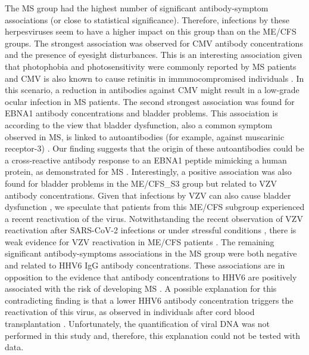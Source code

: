 The MS group had the highest number of significant antibody-symptom associations (or close to statistical significance). Therefore, infections by these herpesviruses seem to have a higher impact on this group than on the ME/CFS groups. The strongest association was observed for CMV antibody concentrations and the presence of eyesight disturbances. This is an interesting association given that photophobia and photosensitivity were commonly reported by MS patients \citep{cortese2018PhotophobiaMultiple} and CMV is also known to cause retinitis in immunocompromised individuals \citep{port2017CytomegalovirusRetinitis}. In this scenario, a reduction in antibodies against CMV might result in a low-grade ocular infection in MS patients. The second strongest association was found for EBNA1 antibody concentrations and bladder problems. This association is according to the view that bladder dysfunction, also a common symptom observed in MS, is linked to autoantibodies (for example, against muscarinic receptor-3) \citep{mccombe2009BladderDysfunction}. Our finding suggests that the origin of these autoantibodies could be a cross-reactive antibody response to an EBNA1 peptide mimicking a human protein, as demonstrated for MS \citep{ayoglu2016AnoctaminIdentified, tengvall2019MolecularMimicry, lanz2022ClonallyExpanded}. Interestingly, a positive association was also found for bladder problems in the ME/CFS\_S3 group but related to VZV antibody concentrations. Given that infections by VZV can also cause bladder dysfunction \citep{sakakibara2022VaricellazosterVirus}, we speculate that patients from this ME/CFS subgroup experienced a recent reactivation of the virus. Notwithstanding the recent observation of VZV reactivation after SARS-CoV-2 infections \citep{martinez-reviejo2022VaricellaZosterVirus} or under stressful conditions \citep{rooney2019HerpesVirus}, there is weak evidence for VZV reactivation in ME/CFS patients \citep{koelle2002MarkersViral, lee2021SalivaryDNA}. The remaining significant antibody-symptoms associations in the MS group were both negative and related to HHV6 IgG antibody concentrations. These associations are in opposition to the evidence that antibody concentrations to HHV6 are positively associated with the risk of developing MS \citep{engdahl2019IncreasedSerological}. A possible explanation for this contradicting finding is that a lower HHV6 antibody concentration triggers the reactivation of this virus, as observed in individuals after cord blood transplantation \citep{nakayama2021ImpactSpecific}. Unfortunately, the quantification of viral DNA was not performed in this study and, therefore, this explanation could not be tested with data.


